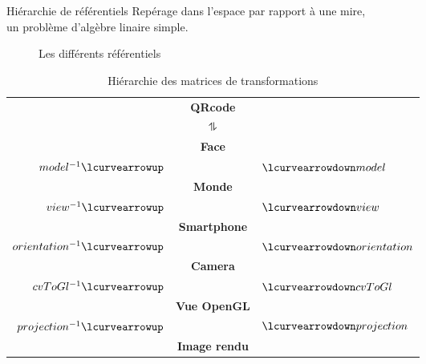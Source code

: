 \documentclass{beamer}
\newcommand*{\rootPath}{}
\begin{document}
\begin{frame}{Hiérarchie de référentiels}
	Repérage dans l'espace par rapport à une mire,\\\hfill un problème d'algèbre linaire simple.

	\vfill

	\begin{minipage}{.45\textwidth}\centering
		\begin{figure}[!ht]\centering
			
			\caption{Les différents référentiels}
			\label{fig:tikz:spaceHierarchie}
		\end{figure}	
	\end{minipage}
	\hfill
	\begin{minipage}{.5\textwidth}\centering
		\begin{table}[!ht]
			\centering\tiny
			\begin{tabular}{rcl}
																					& \textbf{QRcode}				&																\\
				$ $																& $\updownharpoons$			& $ $														\\
																					& \textbf{Face}					&																\\
				$model^{-1}				\lcurvearrowup$	&												& $\lcurvearrowdown model$			\\	
																					& \textbf{Monde}				&																\\
				$view^{-1}				\lcurvearrowup$	& 											& $\lcurvearrowdown view$				\\
																					& \textbf{Smartphone}		&																\\
				$orientation^{-1}	\lcurvearrowup$	& 											& $\lcurvearrowdown orientation$\\
																					& \textbf{Camera}				&																\\	
				$cvToGl^{-1}			\lcurvearrowup$	& 											& $\lcurvearrowdown cvToGl $		\\
																					& \textbf{Vue OpenGL}		&																\\
				$projection^{-1}	\lcurvearrowup$	&												& $\lcurvearrowdown projection$	\\
																					& \textbf{Image rendu}	&
			\end{tabular}
			\caption{Hiérarchie des matrices de transformations}
			\label{ref:table:hierarchie}
		\end{table}
	\end{minipage}

\end{frame}	
\end{document}

